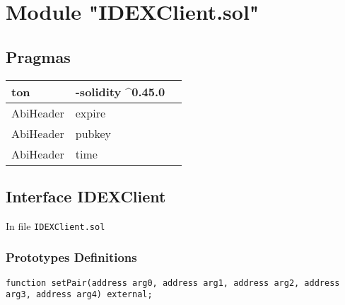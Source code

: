 
\section{Module "IDEXClient.sol"}


\subsection{Pragmas}


\noindent\begin{tabular}{|l|l|p{5cm}|}\hline
ton & -solidity \^{}0.45.0 &\\\hline
AbiHeader &  expire &\\\hline
AbiHeader &  pubkey &\\\hline
AbiHeader &  time &\\\hline
\end{tabular}


\subsection{Interface IDEXClient}


In file {\tt IDEXClient.sol}

\subsubsection{Prototypes Definitions}

\vspace{2cm}

\begin{lstlisting}[firstnumber=7]
  function setPair(address arg0, address arg1, address arg2, address arg3, address arg4) external;
\end{lstlisting}
